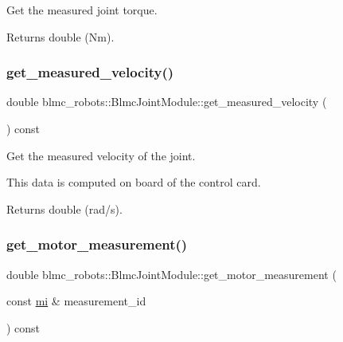 Get the measured joint torque. 

\begin{DoxyReturn}{Returns}
double (Nm). 
\end{DoxyReturn}
\mbox{\label{classblmc__robots_1_1BlmcJointModule_a6db4f8c98e9a3e931b19a98dc1339e27}} 
\subsubsection{\texorpdfstring{get\+\_\+measured\+\_\+velocity()}{get\_measured\_velocity()}}
{\footnotesize\ttfamily double blmc\+\_\+robots\+::\+Blmc\+Joint\+Module\+::get\+\_\+measured\+\_\+velocity (\begin{DoxyParamCaption}{ }\end{DoxyParamCaption}) const}



Get the measured velocity of the joint. 

This data is computed on board of the control card.

\begin{DoxyReturn}{Returns}
double (rad/s). 
\end{DoxyReturn}
\mbox{\label{classblmc__robots_1_1BlmcJointModule_a219d4e433d03ea8a2bae115d5563d844}} 
\subsubsection{\texorpdfstring{get\+\_\+motor\+\_\+measurement()}{get\_motor\_measurement()}}
{\footnotesize\ttfamily double blmc\+\_\+robots\+::\+Blmc\+Joint\+Module\+::get\+\_\+motor\+\_\+measurement (\begin{DoxyParamCaption}\item[{const \hyperlink{common__header_8hpp_a1975c6bb47bc85dfc8edfe349c30dae1}{mi} \&}]{measurement\+\_\+id }\end{DoxyParamCaption}) const\hspace{0.3cm}{\ttfamily [private]}}



